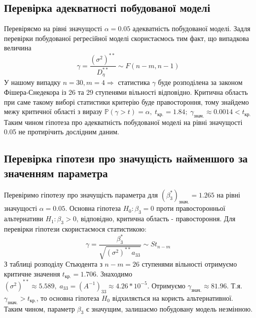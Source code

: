 \documentclass{article}
\begin{document}
    \subsection{Перевірка адекватності побудованої моделі}
      Перевіряємо на рівні значущості $\alpha = 0.05$ адекватність побудованої моделі.  
      Задля перевірки побудованої регресійної моделі скористаємось тим факт, що 
      випадкова величина 
      \begin{equation}
        \gamma = \frac{(\sigma^2)^{**}}{D^{**}_\eta}\sim F(n-m, n-1)
      \end{equation}
      У нашому випадку $n = 30, m = 4 \Rightarrow$ статистика $\gamma$ буде 
      розподілена за законом Фішера-Снедекора із 26 та 29 ступенями вільності 
      відповідно.
      Критична область при саме такому виборі статистики критерію буде правостороння, 
      тому знайдемо межу критичної області з виразу $\mathbb{P}
      (\gamma > t) = \alpha, \; t_{\text{кр.}} = 1.84;\;
      \gamma_\text{знач.} \approx 0.0014 < t_\text{кр.}$
      Таким чином гіпотеза про адекватність побудованої моделі на рівні значущості 
      0.05 не протирічить дослідним даним.
    \subsection{Перевірка гіпотези про значущість найменшого за значенням параметра}
      Перевіримо гіпотезу про значущість параметра для $(\beta_3^*)_{\text{знач.}} = 
      1.265$ на рівні значущості $\alpha = 0.05$. Основна гіпотеза $ H_0 : \beta_3 = 0$ проти правосторонньої 
      альтернативи $ H_1 : \beta_3 > 0$, відповідно, критична область - 
      правостороння. Для перевірки гіпотези скористаємося статистикою:
      \begin{equation}
        \gamma = \frac{\beta_3^*}{\sqrt{(\sigma^2)^{**} a_{33}}} \sim St_{n-m}
      \end{equation}
      З таблиці розподілу Стьюдента з $n - m = 26$ ступенями вільності 
      отримуємо критичне значення $t_\text{кр.} = 1.706$. Знаходимо $(\sigma^2)^{**} 
      \approx 5.589, \; a_{33} = (A^{-1})_{33} \approx 4.26 * 10^{-5}$. Отримуємо 
      $\gamma_\text{знач.} \approx 81.96$. Т.я. $\gamma_\text{знач.} > t_\text{кр.}$, 
      то основна гіпотеза $H_0$ відхиляється на користь альтернативної. Таким чином, 
      параметр $\beta_3$ є значущим, залишаємо побудовану модель незмінною.
\end{document}
